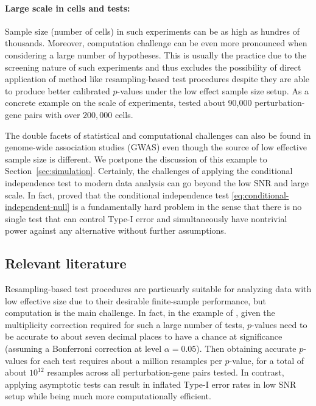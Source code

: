 \documentclass[12pt]{article}
\theoremstyle{definition}
\begin{document}
\paragraph{Large scale in cells and tests:}

Sample size (number of cells) in such experiments can be as high as hundres of thousands. Moreover, computation challenge can be even more pronounced when considering a large number of hypotheses. This is usually the practice due to the screening nature of such experiments and thus excludes the possibility of direct application of method like resampling-based test procedures despite they are able to produce better calibrated $p$-values under the low effect sample size setup. As a concrete example on the scale of experiments, \citet{Gasperini2019a} tested about 90,000 perturbation-gene pairs with over $200,000$ cells. 

The double facets of statistical and computational challenges can also be found in genome-wide association studies (GWAS) even though the source of low effective sample size is different. We postpone the discussion of this example to Section~\ref{sec:simulation}. Certainly, the  challenges of applying the conditional independence test to modern data analysis can go beyond the low SNR and large scale. In fact, \citep{Shah2018} proved that the conditional independence test \eqref{eq:conditional-independent-null} is a fundamentally hard problem in the sense that there is no single test that can control Type-I error and simultaneously have nontrivial power against any alternative without further assumptions. 

\subsection{Relevant literature}

Resampling-based test procedures are particuarly suitable for analyzing data with low effective size due to their desirable finite-sample performance, but computation is the main challenge. In fact, in the example of \citet{Gasperini2019a}, given the multiplicity correction required for such a large number of tests, $p$-values need to be accurate to about seven decimal places to have a chance at significance (assuming a Bonferroni correction at level $\alpha = 0.05$). Then obtaining accurate $p$-values for each test requires about a million resamples per $p$-value, for a total of about $10^{12}$ resamples across all perturbation-gene pairs tested. In contrast, applying asymptotic tests can result in inflated Type-I error rates in low SNR setup while being much more computationally efficient. 
\end{document}
